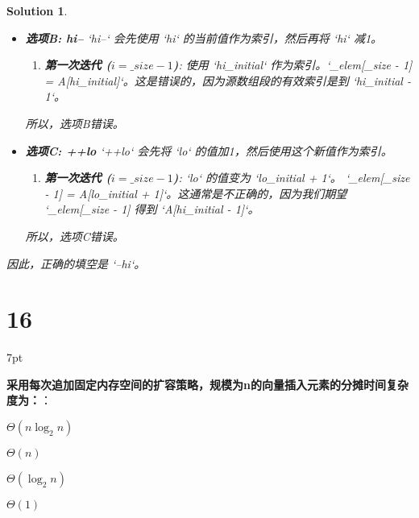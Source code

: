 \documentclass[UTF8]{report}
\newtheorem{solution}{Solution}
\theoremstyle{MyLineTheoremStyle} %
\theoremstyle{MyBlockTheoremStyle} %
\theoremstyle{MySubsubsectionStyle} %
\newenvironment{graybox}{%
        \def\FrameCommand{%
        \hspace{1pt}%
        {\color{gray}\small \vrule width 2pt}%
        {\color{graybox_color}\vrule width 4pt}%
        \colorbox{graybox_color}%
        }%
        \MakeFramed{\advance\hsize-\width\FrameRestore}%
        \noindent\hspace{-4.55pt}%
        \begin{adjustwidth}{}{7pt}%
        \vspace{2pt}\vspace{2pt}%
        }
        {%
        \vspace{2pt}\end{adjustwidth}\endMakeFramed%
        }
\begin{document}
\begin{solution}
\begin{itemize}
    所以，选项A (`--hi`) 是正确的。

    \item \textbf{选项B: hi--}
    `hi--` 会先使用 `hi` 的当前值作为索引，然后再将 `hi` 减1。
    \begin{enumerate}
        \item \textbf{第一次迭代 ($i = \_size - 1$)}:
        使用 `hi\_initial` 作为索引。`\_elem[\_size - 1] = A[hi\_initial]`。这是错误的，因为源数组段的有效索引是到 `hi\_initial - 1`。
    \end{enumerate}
    所以，选项B错误。

    \item \textbf{选项C: ++lo}
    `++lo` 会先将 `lo` 的值加1，然后使用这个新值作为索引。
    \begin{enumerate}
        \item \textbf{第一次迭代 ($i = \_size - 1$)}:
        `lo` 的值变为 `lo\_initial + 1`。
        `\_elem[\_size - 1] = A[lo\_initial + 1]`。这通常是不正确的，因为我们期望 `\_elem[\_size - 1] 得到 `A[hi\_initial - 1]`。
    \end{enumerate}
    所以，选项C错误。
\end{itemize}
因此，正确的填空是 `--hi`。
\end{solution}

\section*{16}

\begin{graybox}
\textbf{采用每次追加固定内存空间的扩容策略，规模为n的向量插入元素的分摊时间复杂度为：}：
\begin{circledenum}
    \item $\Theta(n\log_{2}n)$
    \item $\Theta(n)$
    \item $\Theta(\log_{2}n)$
    \item $\Theta(1)$
\end{circledenum}
\end{graybox}
\end{document}
